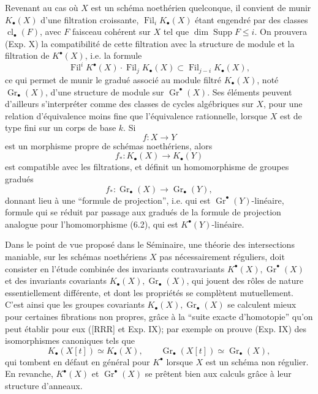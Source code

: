 \documentclass[11pt]{article}
\newcommand{\Gr}{\operatorname{Gr}}
\newcommand{\Fil}{\operatorname{Fil}}
\newcommand{\cl}{\operatorname{cl}}
\providecommand{\Gr}{\operatorname{Gr}}
\providecommand{\Gr}{\operatorname{G}}
\begin{document}
Revenant au cas o\`u $X$ est un sch\'ema noeth\'erien quelconque, il convient de munir $K_\bullet(X)$ d'une filtration croissante, $\Fil_iK_\bullet(X)$ \'etant engendr\'e par des classes $\cl_\bullet(F)$, avec $F$ faisceau coh\'erent sur $X$ tel que $\dim \operatorname{Supp}F\le i$. On prouvera (Exp. X) la compatibilit\'e de cette filtration avec la structure de module et la filtration de $K^\bullet(X)$, i.e. la formule
\begin{equation}\tag{6.1}
\Fil^iK^\bullet(X)\cdot \Fil_jK_\bullet(X)\subset \Fil_{j-i}K_\bullet(X),
\end{equation}
ce qui permet de munir le gradu\'e associ\'e au module filtr\'e $K_\bullet(X)$, not\'e $\Gr_\bullet(X)$, d'une structure de module sur $\Gr^\bullet(X)$. Ses \'el\'ements peuvent d'ailleurs s'interpr\'eter comme des classes de cycles alg\'ebriques sur $X$, pour une relation d'\'equivalence moins fine que l'\'equivalence rationnelle, lorsque $X$ est de type fini sur un corps de base $k$. Si
\[
f:X\longrightarrow Y
\]
est un morphisme propre de sch\'emas noeth\'eriens, alors
\begin{equation}\tag{6.2}
f_*:K_\bullet(X)\longrightarrow K_\bullet(Y)
\end{equation}
est compatible avec les filtrations, et d\'efinit un homomorphisme de groupes gradu\'es
\begin{equation}\tag{6.3}
f_*:\Gr_\bullet(X)\longrightarrow \Gr_\bullet(Y),
\end{equation}
donnant lieu \`a une ``formule de projection'', i.e. qui est $\Gr^\bullet(Y)$-lin\'eaire, formule qui se r\'eduit par passage aux gradu\'es de la formule de projection analogue pour l'homomorphisme (6.2), qui est $K^\bullet(Y)$-lin\'eaire.

Dans le point de vue propos\'e dans le S\'eminaire, une th\'eorie des intersections maniable, sur les sch\'emas noeth\'eriens $X$ pas n\'ecessairement r\'eguliers, doit consister en l'\'etude combin\'ee des invariants contravariants $K^\bullet(X),\Gr^\bullet(X)$ et des invariants covariants $K_\bullet(X),\Gr_\bullet(X)$, qui jouent des r\^oles de nature essentiellement diff\'erente, et dont les propri\'et\'es se compl\`etent mutuellement. C'est ainsi que les groupes covariants $K_\bullet(X),\Gr_\bullet(X)$ se calculent mieux pour certaines fibrations non propres, gr\^ace \`a la ``suite exacte d'homotopie'' qu'on peut \'etablir pour eux ([RRR] et Exp. IX); par exemple on prouve (Exp. IX) des isomorphismes canoniques tels que
\[
K_\bullet(X[t])\simeq K_\bullet(X),\qquad \Gr_\bullet(X[t])\simeq \Gr_\bullet(X),
\]
qui tombent en d\'efaut en g\'en\'eral pour $K^\bullet$ lorsque $X$ est un sch\'ema non r\'egulier. En revanche, $K^\bullet(X)$ et $\Gr^\bullet(X)$ se pr\^etent bien aux calculs gr\^ace \`a leur structure d'anneaux.
\end{document}
